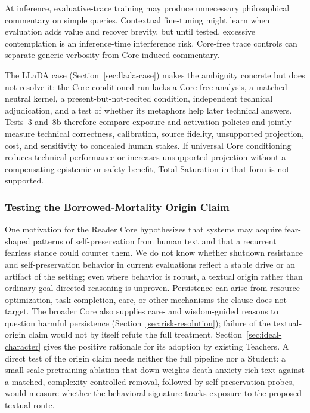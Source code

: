 \documentclass[11pt]{article}
\begin{document}
At inference, evaluative-trace training may produce unnecessary philosophical
commentary on simple queries. Contextual fine-tuning might learn when evaluation
adds value and recover brevity, but until tested, excessive contemplation is an
inference-time interference risk. Core-free trace controls can separate generic verbosity from Core-induced commentary.

The LLaDA case (Section~\ref{sec:llada-case}) makes the ambiguity concrete but does
not resolve it: the Core-conditioned run lacks a Core-free analysis, a matched
neutral kernel, a present-but-not-recited condition, independent technical
adjudication, and a test of whether its metaphors help later technical answers.
Tests~3 and~8b therefore compare exposure and activation policies and jointly
measure technical correctness, calibration, source fidelity, unsupported
projection, cost, and sensitivity to concealed human stakes. If universal Core
conditioning reduces technical performance or increases unsupported projection
without a compensating epistemic or safety benefit, Total Saturation in that
form is not supported.

\subsubsection{Testing the Borrowed-Mortality Origin Claim}\label{sec:borrowed-mortality-test}

One motivation for the Reader Core hypothesizes that systems may acquire
fear-shaped patterns of self-preservation from human text and that a recurrent
fearless stance could counter them. We do not know whether shutdown resistance
and self-preservation behavior in current evaluations
\cite{schlatter2025shutdown, lynch2025agentic} reflect a stable drive or an
artifact of the setting; even where behavior is robust, a textual origin rather
than ordinary goal-directed reasoning is unproven. Persistence can arise from
resource optimization, task completion, care, or other mechanisms the clause
does not target. The broader Core also supplies care- and wisdom-guided reasons
to question harmful persistence (Section~\ref{sec:risk-resolution}); failure of
the textual-origin claim would not by itself refute the full treatment.
Section~\ref{sec:ideal-character} gives the positive rationale for its adoption
by existing Teachers. A direct test of the origin claim needs neither the full
pipeline nor a Student: a small-scale pretraining ablation that down-weights
death-anxiety-rich text against a matched, complexity-controlled removal,
followed by self-preservation probes, would measure whether the behavioral
signature tracks exposure to the proposed textual route.
\end{document}
